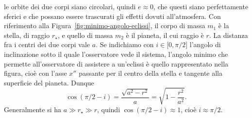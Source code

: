 le orbite dei due corpi siano circolari, quindi $e \approx 0$, che questi siano
perfettamente sferici e che possano essere trascurati gli effetti dovuti
all'atmosfera. Con riferimento alla Figura~\ref{fig:minimo-angolo-eclissi}, il
corpo di massa $m_1$ è la stella, di raggio $r_\star$, e quello di massa $m_2$ è
il pianeta, il cui raggio è $r$. La distanza fra i centri dei due corpi vale
$a$. Se indichiamo con $i \in \mathopen{[}0, \pi/2\mathclose{]}$ l'angolo di
inclinazione sotto il quale l'osservatore vede il sistema, l'angolo minimo che
permette all'osservatore di assistere a un'eclissi è quello rappresentato nella
figura, cioè con l'asse $x''$ passante per il centro della stella e tangente
alla superficie del pianeta. Dunque
\begin{equation}
  \cos(\pi/2 - i) = \frac{\sqrt{a^2 - r^2}}{a} = \sqrt{1 - \frac{r^2}{a^2}}.
\end{equation}
Generalmente si ha $a \gg r_\star \gg r$, quindi $\cos(\pi/2 - i) \approx 1$,
cioè $i \approx \pi/2$.

